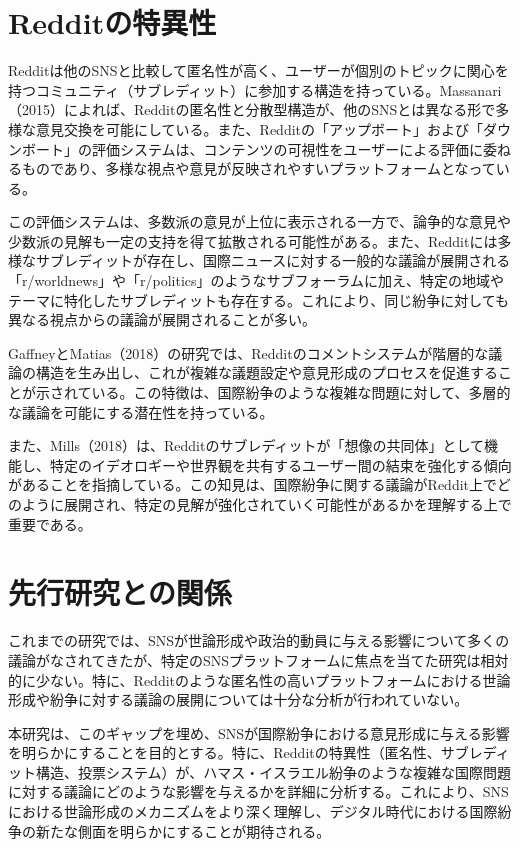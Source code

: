 \documentclass[11pt, a4j]{jreport}
\begin{document}
    \section{Redditの特異性}
    Redditは他のSNSと比較して匿名性が高く、ユーザーが個別のトピックに関心を持つコミュニティ（サブレディット）に参加する構造を持っている。Massanari（2015）によれば、Redditの匿名性と分散型構造が、他のSNSとは異なる形で多様な意見交換を可能にしている。また、Redditの「アップボート」および「ダウンボート」の評価システムは、コンテンツの可視性をユーザーによる評価に委ねるものであり、多様な視点や意見が反映されやすいプラットフォームとなっている。

    この評価システムは、多数派の意見が上位に表示される一方で、論争的な意見や少数派の見解も一定の支持を得て拡散される可能性がある。また、Redditには多様なサブレディットが存在し、国際ニュースに対する一般的な議論が展開される「r/worldnews」や「r/politics」のようなサブフォーラムに加え、特定の地域やテーマに特化したサブレディットも存在する。これにより、同じ紛争に対しても異なる視点からの議論が展開されることが多い。

    GaffneyとMatias（2018）の研究では、Redditのコメントシステムが階層的な議論の構造を生み出し、これが複雑な議題設定や意見形成のプロセスを促進することが示されている。この特徴は、国際紛争のような複雑な問題に対して、多層的な議論を可能にする潜在性を持っている。

    また、Mills（2018）は、Redditのサブレディットが「想像の共同体」として機能し、特定のイデオロギーや世界観を共有するユーザー間の結束を強化する傾向があることを指摘している。この知見は、国際紛争に関する議論がReddit上でどのように展開され、特定の見解が強化されていく可能性があるかを理解する上で重要である。

    \section{先行研究との関係}
    これまでの研究では、SNSが世論形成や政治的動員に与える影響について多くの議論がなされてきたが、特定のSNSプラットフォームに焦点を当てた研究は相対的に少ない。特に、Redditのような匿名性の高いプラットフォームにおける世論形成や紛争に対する議論の展開については十分な分析が行われていない。

    本研究は、このギャップを埋め、SNSが国際紛争における意見形成に与える影響を明らかにすることを目的とする。特に、Redditの特異性（匿名性、サブレディット構造、投票システム）が、ハマス・イスラエル紛争のような複雑な国際問題に対する議論にどのような影響を与えるかを詳細に分析する。これにより、SNSにおける世論形成のメカニズムをより深く理解し、デジタル時代における国際紛争の新たな側面を明らかにすることが期待される。
\end{document}
